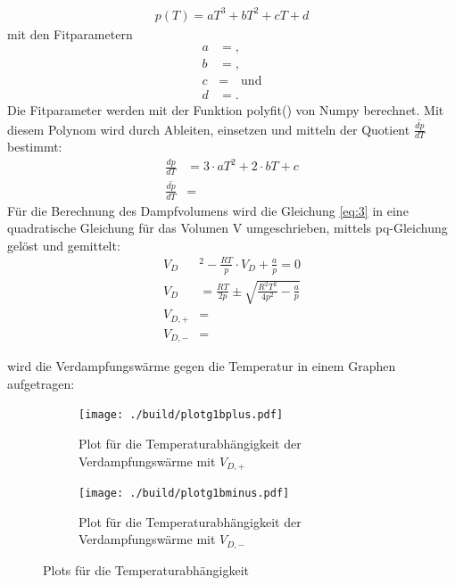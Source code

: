 \begin{align}
    p(T)= aT^3 +bT^2 +cT +d \label{eq:9}
\end{align}
mit den Fitparametern
\begin{subequations} \label{eq:10}
\begin{align}
    a &= \text{}, \label{eq:10a}\\
    b &= \text{}, \label{eq:10b}\\
    c &= \text{} \quad \text{und} \label{eq:10c}\\
    d &= \text{}. \label{eq:10d}
\end{align}
\end{subequations}
Die Fitparameter werden mit der Funktion polyfit() von Numpy \cite{numpy} berechnet.
Mit diesem Polynom wird durch Ableiten, einsetzen und mitteln der Quotient $\overline{\frac{dp}{dT}}$ bestimmt:
\begin{align} 
    \frac{dp}{dT}&= 3\cdot a T^2+2\cdot b T+c \label{eq:11}\\
    \overline{\frac{dp}{dT}}&= \text{} \label{eq:12}
\end{align}
Für die Berechnung des Dampfvolumens wird die Gleichung \eqref{eq:3} in eine 
quadratische Gleichung für das Volumen V umgeschrieben, mittels pq-Gleichung gelöst
und gemittelt:
\begin{subequations} \label{eq:13}
\begin{align}
    V_D&^2-\frac{RT}{p}\cdot V_D+\frac{a}{p}=0 \label{eq:13a}\\
    V_D&= \frac{RT}{2p} \pm \sqrt{\frac{R^2T^2}{4p^2} -\frac{a}{p} } \label{eq:13b}\\
    V_{D,+}&= \text{} \label{eq:13c}\\
    V_{D,-}&= \text{} \label{eq:13d}
\end{align}
\end{subequations}

\justifying wird die Verdampfungswärme gegen die Temperatur in einem Graphen aufgetragen:

\begin{figure}[H]
\begin{subfigure}{0.495\linewidth}
    \centering
    \texttt{[image: ./build/plotg1bplus.pdf]}
    \caption{Plot für die Temperaturabhängigkeit der Verdampfungswärme mit $V_{D,+}$}
    \label{fig:5a}
\end{subfigure}
\begin{subfigure}{0.495\linewidth}
    \centering
    \texttt{[image: ./build/plotg1bminus.pdf]}
    \caption{Plot für die Temperaturabhängigkeit der Verdampfungswärme mit $V_{D,-}$}
    \label{fig:5b}
\end{subfigure}
\caption{Plots für die Temperaturabhängigkeit\label{fig:5}}
\end{figure}


